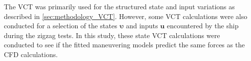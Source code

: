 \noindent The VCT was primarily used for the structured state and input variations as described in \autoref{sec:methodology_VCT}. However, some VCT calculations were also conducted for a selection of the states $\pmb{\bm{\upsilon}}$ and inputs $\mathbf{u}$ encountered by the ship during the zigzag tests. In this study, these state VCT calculations were conducted to see if the fitted maneuvering models predict the same forces as the CFD calculations.